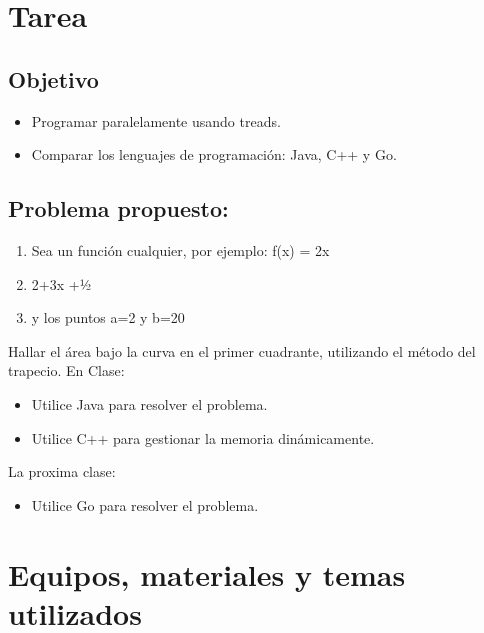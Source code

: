 \section{Tarea}

\subsection{Objetivo}

\begin{itemize}
    \item Programar paralelamente usando treads.  
    \item Comparar los lenguajes de programación: Java, C++ y Go.
\end{itemize}



\subsection{Problema propuesto: }

\begin{enumerate}[label={ }]
    \item Sea un función cualquier, por ejemplo: f(x) = 2x
    \item 2+3x +1⁄2
    \item y los puntos a=2 y b=20
\end{enumerate}
Hallar el área bajo la curva en el primer cuadrante, utilizando el método del trapecio.
En Clase:
\begin{itemize}
    \item Utilice Java para resolver el problema.
    \item Utilice C++ para gestionar la memoria dinámicamente.
\end{itemize}
La proxima clase:
\begin{itemize}
    \item Utilice Go para resolver el problema.
\end{itemize}



\section{Equipos, materiales y temas utilizados}

